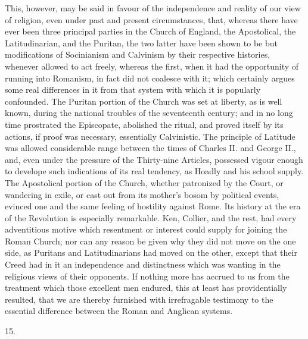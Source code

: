 This, however, may be said in favour of the independence and
reality of our view of religion, even under past and present
circumstances, that, whereas there have ever been three principal
parties in the Church of England, the Apostolical, the Latitudinarian,
and the Puritan, the two latter have been shown to be but
modifications of Socinianism and Calvinism by their respective
histories, whenever allowed to act freely, whereas the first, when it
had the opportunity of running into Romanism, in fact did not coalesce
with it; which certainly argues some real differences in it from that
system with which it is popularly confounded. The Puritan portion of
the Church was set at liberty, as is well known, during the national
troubles of the seventeenth century; and in no long time prostrated
the Episcopate, abolished the ritual, and proved itself by its
actions, if proof was necessary, essentially Calvinistic. The
principle of Latitude was allowed considerable range between the times
of Charles II. and George II., and, even under the pressure of the
Thirty-nine Articles, possessed vigour enough to develope such
indications of its real tendency, as Hoadly and his school supply. The
Apostolical portion of the Church, whether patronized by the Court, or
wandering in exile, or cast out from its mother's bosom by political
events, evinced one and the same feeling of hostility against Rome.
Its history at the era of the Revolution is especially remarkable.
Ken, Collier, and the rest, had every adventitious motive which
resentment or interest could supply for joining the Roman Church; nor
can any reason be given why they did not move on the one side, as
Puritans and Latitudinarians had moved on the other, except that their
Creed had in it an independence and distinctness which was wanting in
the religious views of their opponents. If nothing more has accrued to
us from the treatment which those excellent men endured, this at least
has providentially resulted, that we are thereby furnished with
irrefragable testimony to the essential difference between the
Roman and Anglican systems.

15.

